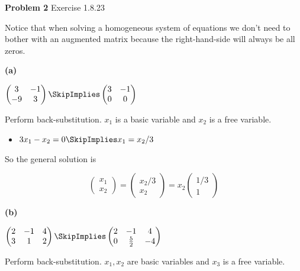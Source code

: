 \documentclass[oneside,12pt]{amsart}
\begin{document}
\bigskip


\textbf{Problem 2} Exercise 1.8.23

\bigskip

Notice that when solving a homogeneous system of equations we don't need
to bother with an augmented matrix because the right-hand-side will always
be all zeros.

\textbf{(a)}

$
\begin{pmatrix}
 3 & -1 \\
-9 &  3
\end{pmatrix}
\SkipImplies
\begin{pmatrix}
3 & -1 \\
0 &  0
\end{pmatrix}
$

\bigskip

Perform back-substitution. $x_1$ is a basic variable and $x_2$ is a
free variable.

\begin{itemize}
\item $3x_1 -x_2 = 0  \SkipImplies x_1 = x_2/3$
\end{itemize}

So the general solution is

$$
\begin{pmatrix}
 x_1 \\ x_2
\end{pmatrix}
=
\begin{pmatrix}
 x_2/3 \\ x_2
\end{pmatrix}
=
x_2
\begin{pmatrix}
 1/3 \\ 1
\end{pmatrix}
$$

\bigskip

\textbf{(b)}

\bigskip

$
\begin{pmatrix}
2 & -1 & 4 \\
3 & 1  &  2
\end{pmatrix}
\SkipImplies
\begin{pmatrix}
2 & -1 & 4           \\
0 & \frac{5}{2} & -4
\end{pmatrix}
$

\bigskip

Perform back-substitution. $x_1,x_2$ are basic variables and $x_3$ is a
free variable.
\end{document}
